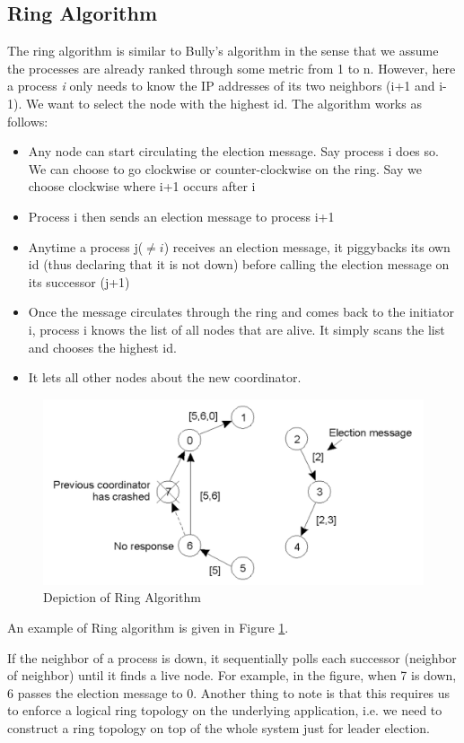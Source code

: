 \documentclass[twoside]{article}
\begin{document}
\subsection{Ring Algorithm}
The ring algorithm is similar to Bully's algorithm in the sense that we assume the processes are already ranked through some metric from 1 to n. However, here a process \emph{i} only needs to know the IP addresses of its two neighbors (i+1 and i-1). We want to select the node with the highest id. The algorithm works as follows:
\begin{itemize}
\item{Any node can start circulating the election message. Say process i does so. We can choose to go clockwise or counter-clockwise on the ring. Say we choose clockwise where i+1 occurs after i}
\item{Process i then sends an election message to process i+1}
\item{Anytime a process j($\neq i$) receives an election message, it piggybacks its own id (thus declaring that it is not down) before calling the election message on its successor (j+1)}
\item{Once the message circulates through the ring and comes back to the initiator i, process i knows the list of all nodes that are alive. It simply scans the list and chooses the highest id.}
\item{It lets all other nodes about the new coordinator.}
\end{itemize}
\begin{figure}[h!]
\centering
\includegraphics[scale=0.3]{./ring.png}
\caption{Depiction of Ring Algorithm}
\label{fig:ring}
\end{figure} 
An example of Ring algorithm is given in Figure \ref{fig:ring}.

If the neighbor of a process is down, it sequentially polls each successor (neighbor of neighbor) until it finds a live node. For example, in the figure, when 7 is down, 6 passes the election message to 0. Another thing to note is that this requires us to enforce a logical ring topology on the underlying application, i.e. we need to construct a ring topology on top of the whole system just for leader election.
\end{document}
